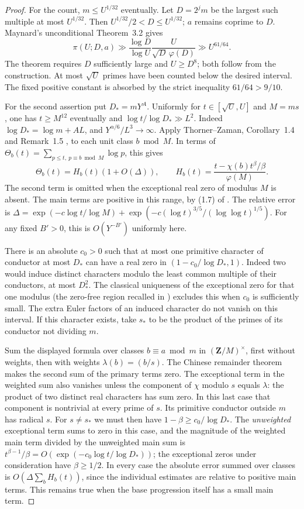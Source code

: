\begin{proof}
For the count, \(m\le U^{1/32}\) eventually. Let \(D=2^j m\) be the largest
such multiple at most \(U^{1/32}\). Then \(U^{1/32}/2<D\le U^{1/32}\);
\(a\) remains coprime to \(D\). Maynard's unconditional Theorem~3.2
\cite{maynard} gives
\[
 \pi(U;D,a)\gg \frac{\log D}{\log U}\frac{U}{\sqrt D\,\varphi(D)}
              \gg U^{61/64}.
\]
The theorem requires \(D\) sufficiently large and \(U\ge D^8\); both follow
from the construction. At most \(\sqrt U\) primes have been counted below the
desired interval. The fixed positive constant is absorbed by the strict
inequality \(61/64>9/10\).

For the second assertion put \(D_*=mY^A\). Uniformly for \(t\in[\sqrt U,U]\)
and \(M=ms\), one has \(t\ge M^{12}\) eventually and
\(\log t/\log D_*\gg L^2\). Indeed \(\log D_*=\log m+AL\),
and \(Y^{\alpha/6}/L^3\to\infty\). Apply Thorner--Zaman, Corollary~1.4
and Remark~1.5 \cite{tz}, to each unit class \(b\bmod M\). In terms of
\(\Theta_b(t)=\sum_{p\le t,\ p\equiv b\bmod M}\log p\), this gives
\[
 \Theta_b(t)=H_b(t)(1+O(\Delta)),\qquad
 H_b(t)=\frac{t-\chi(b)t^\beta/\beta}{\varphi(M)} .
\]
The second term is omitted when the exceptional real zero of modulus \(M\)
is absent. The main terms are positive in this range, by (1.7) of
\cite{tz}. The relative error is
\(\Delta=\exp(-c\log t/\log M)+
 \exp(-c(\log t)^{3/5}/(\log\log t)^{1/5})\).
For any fixed \(B'>0\), this is \(O(Y^{-B'})\) uniformly here.

There is an absolute \(c_0>0\) such that at most one primitive character
of conductor at most \(D_*\) can have a real zero in
\((1-c_0/\log D_*,1)\). Indeed two would induce distinct characters
modulo the least common multiple of their conductors, at most \(D_*^2\).
The classical uniqueness of the exceptional zero for that one modulus
(the zero-free region recalled in \cite[\S1.1]{tz}) excludes this when
\(c_0\) is sufficiently small. The extra Euler factors of an induced
character do not vanish on this interval. If this character exists, take
\(s_*\) to be the product of the primes of its conductor not dividing \(m\).

Sum the displayed formula over classes \(b\equiv a\bmod m\) in
\((\mathbf Z/M)^\times\), first without weights, then with weights
\(\lambda(b)=(b/s)\). The Chinese remainder theorem makes the second
sum of the primary terms zero. The exceptional term in the weighted sum
also vanishes unless the component of \(\chi\) modulo \(s\) equals
\(\lambda\): the product of two distinct real characters has sum zero.
In this last case that component is nontrivial at every prime of \(s\).
Its primitive conductor outside \(m\) has radical \(s\). For \(s\ne s_*\)
we must then have \(1-\beta\ge c_0/\log D_*\). The \emph{unweighted}
exceptional term sums to zero in this case, and the magnitude of the
weighted main term divided by the unweighted main sum is
\(t^{\beta-1}/\beta=O(\exp(-c_0\log t/\log D_*))\);
the exceptional zeros under consideration have \(\beta\ge1/2\).
In every case the absolute error summed over classes is
\(O(\Delta\sum_b H_b(t))\), since the individual estimates are relative
to positive main terms. This remains true when the base progression
itself has a small main term.


\end{proof}
